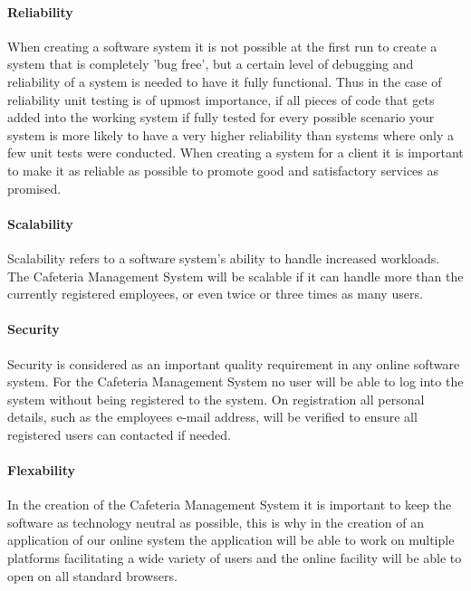 \documentclass[12pt]{article}
\begin{document}
\paragraph{ Reliability\\}
When creating a software system it is not possible at the first run to create a system that is completely 'bug free', but a certain level of debugging and reliability of a system is needed to have it fully functional. Thus in the case of reliability unit testing is of upmost importance, if all pieces of code that gets added into the working system if fully tested for every possible scenario your system is more likely to have a very higher reliability than systems where only a few unit tests were conducted. When creating a system for a client it is important to make it as reliable as possible to promote good and satisfactory services as promised.

\paragraph{Scalability\\}
Scalability refers to a software system's ability to handle increased workloads. The Cafeteria Management System will be scalable if it can handle more than the currently registered employees, or even twice or three times  as many users.  

\paragraph{Security\\}
Security is considered as an important quality requirement in any online software system. For the Cafeteria Management System no user will be able to log into the system without being registered to the system. On registration all personal details, such as the employees e-mail address, will be verified to ensure all registered users can contacted if needed. 

\paragraph{Flexability\\}
In the creation of the Cafeteria Management System it is important to keep the software as technology neutral as possible, this is why in the creation of an application of our online system the application will be able to work on multiple platforms facilitating a wide variety of users and the online facility will be able to open on all standard browsers. 
\end{document}
